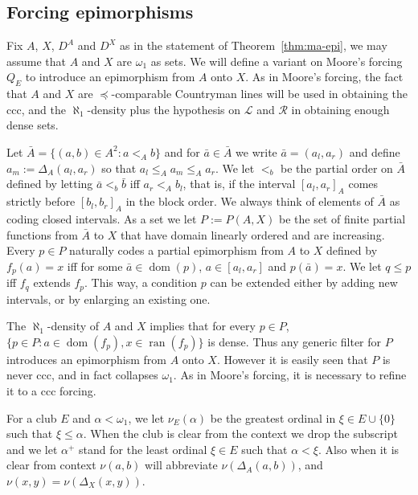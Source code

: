 \documentclass[10pt]{amsart}
\theoremstyle{definition}
\theoremstyle{remark}
\newcommand{\eleq}{\preceq}
\newcommand{\ba}{\bar{a}}
\newcommand{\bb}{\bar{b}}
\renewcommand{\L}{\mathscr{L}}
\newcommand{\R}{\mathscr{R}}
\newcommand{\1}{\mathbbm{1}}
\DeclareMathOperator{\dom}{dom}
\DeclareMathOperator{\ran}{ran}
\begin{document}
\subsection{Forcing epimorphisms} Fix $A$, $X$, $D^{A}$ and $D^{X}$ as in the statement of
 Theorem~\ref{thm:ma-epi}, we may assume that $A$ and $X$
are $\omega_{1}$ as sets. We will define a variant on Moore's forcing
$Q_{E}$  to introduce an epimorphism from $A$ onto $X$. As in
Moore's forcing,
the fact that $A$ and $X$ are $\eleq$-comparable Countryman lines
will be used in obtaining the ccc, and the $\aleph_{1}$-density
plus the hypothesis on $\L$ and $\R$ in obtaining enough dense
sets.

Let $\bar{A} = \{(a,b) \in A^{2} : a <_{A} b\}$ and for $\bar{a} \in
\bar{A}$ we write $\bar{a} = (a_{l},a_{r})$ and define $a_{m} :=
\Delta_{A}(a_{l},a_{r})$ so that $a_{l} \le_{A} a_{m} \le_{A} a_{r}$. We
let $<_{b}$ be the partial order on $\bar{A}$ defined by letting $\ba <_{b} \bb$
iff $a_{r} <_{A} b_{l}$, that is, if the interval
${[a_{l},a_{r}]}_{A}$ comes strictly before ${[b_{l},b_{r}]}_{A}$ in the
block order. We always think of elements of $\bar{A}$ as coding
closed intervals. As a set we let $P := P(A,X)$ be the set of finite partial
functions from $\bar{A}$ to $X$ that have domain linearly ordered and
are increasing.  Every $p \in P$ naturally codes a partial epimorphism
from $A$ to $X$ defined by $f_{p}(a) = x$ iff for some $\ba \in
\dom(p)$, $a \in [a_{l},a_{r}]$ and $p(\ba) = x$.  We let $q \le p$
iff $f_{q}$ extends $f_{p}$. This way, a condition $p$ can be extended
either by adding new intervals, or by enlarging an existing one.

The $\aleph_{1}$-density of $A$ and
$X$ implies that for every $p \in P$,
$\{p \in P : a \in \dom(f_{p}), x \in \ran(f_{p})\}$ is dense.
Thus any generic filter for $P$ introduces an epimorphism from $A$
onto $X$.  However it is easily seen that $P$
is never ccc, and in fact collapses $\omega_{1}$.
As in Moore's forcing, it is necessary to refine it
to a ccc forcing.

For a club $E$ and $\alpha < \omega_{1}$, we let
$\nu_{E}(\alpha)$ be the greatest ordinal in $\xi \in E \cup \{0\}$
such that $\xi \le \alpha$. When
the club is clear from the context we drop the subscript and
we let $\alpha^{+}$ stand for the least ordinal $\xi \in E$ such that $\alpha < \xi$.
Also when it is clear from context $\nu(a,b)$ will abbreviate
$\nu(\Delta_{A}(a,b))$, and $\nu(x,y) = \nu(\Delta_{X}(x,y))$.
\end{document}

